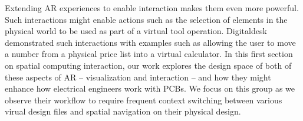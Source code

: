 \documentclass [11pt, proquest] {uwthesis}[2020/02/24]
\begin{document}
Extending AR experiences to enable interaction makes them even more powerful.
Such interactions might enable actions such as the selection of elements in the physical world to be used as part of a virtual tool operation.
Digitaldesk \cite{Wellner1993InteractingDigitaldesk} demonstrated such interactions with examples such as allowing the user to move a number from a physical price list into a virtual calculator.
In this first section on spatial computing interaction, our work explores the design space of both of these aspects of AR -- visualization and interaction -- and how they might enhance how electrical engineers work with PCBs. We focus on this group as we observe their workflow to require frequent context switching between various virual design files and spatial navigation on their physical design.


\end{document}
